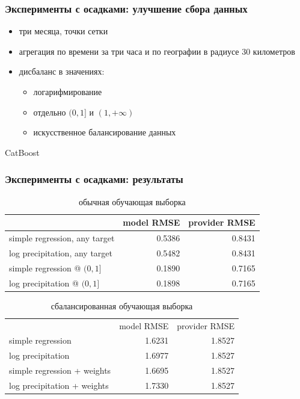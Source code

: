 \documentclass{beamer}
\begin{document}
\begin{frame}\frametitle{\large Эксперименты с осадками: улучшение сбора данных}

\begin{itemize}
    \item три месяца, точки сетки
    \item агрегация по времени за три часа и по географии в радиусе 30 километров
    \item дисбаланс в значениях: \\
    \begin{itemize}
        \item логарифмирование
        \item отдельно $(0, 1]$ и $(1, +\infty)$
        \item искусственное балансирование данных
    \end{itemize}
\end{itemize}

CatBoost 

\end{frame}




\begin{frame}\frametitle{\large Эксперименты с осадками: результаты}

\small{

\begin{table}[H]
  \centering
  \begin{tabular}{ l | r | r }
     & model RMSE & provider RMSE \\ 
     \hline
    simple regression, any target &  0.5386  &  0.8431 \\ 
    log precipitation, any target &  0.5482  &  0.8431 \\ 
    simple regression @ $(0, 1]$  &  0.1890  &  0.7165 \\ 
    log precipitation @ $(0, 1]$  &  0.1898  &  0.7165 \\ 
  \end{tabular}
  \caption*{обычная обучающая выборка}
  \label{table_simple_pool}
\end{table}

\begin{table}[H]
  \centering
  \begin{tabular}{ l | r | r }
     & model RMSE & provider RMSE \\ 
    simple regression             &  1.6231  &  1.8527 \\ 
    log precipitation             &  1.6977  &  1.8527 \\ 
    simple regression + weights   &  1.6695  &  1.8527 \\ 
    log precipitation + weights   &  1.7330  &  1.8527 \\ 
  \end{tabular}
  \caption*{сбалансированная обучающая выборка}
  \label{table_balanced_pool}
\end{table}


}
\end{frame}
\end{document}
